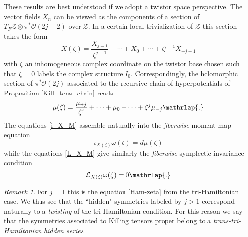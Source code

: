 \documentclass[11pt]{amsart}
\theoremstyle{remark}
\newtheorem*{remark}{Remark}
\theoremstyle{remark}
\theoremstyle{definition}
\theoremstyle{definition}
\theoremstyle{definition}
\newcommand{\0}{{\scriptstyle 0'}} %
\newcommand{\1}{{\scriptstyle 1'}}
\begin{document}
These results are best understood if we adopt a twistor space perspective. The vector fields $X_n$ can be viewed as the components of a section of $T_F\mathcal{Z} \otimes \pi^*\mathcal{O}(2j-2)$ over $\mathcal{Z}$. In a certain local trivialization of $\mathcal{Z}$ this section takes the form
\begin{equation} \label{twisted_X}
X(\zeta) = \frac{X_{j-1}}{\zeta^{j-1}} + \cdots + X_0 + \cdots + \zeta^{j-1} X_{-j+1}
\end{equation}
with $\zeta$ an inhomogeneous complex coordinate on the twistor base chosen such that $\zeta = 0$ labels the complex structure $I_0$. Correspondingly, the holomorphic section of $\pi^*\mathcal{O}(2j)$ associated to the recursive chain of hyperpotentials of Proposition \ref{Kill_tens_chain} reads
\begin{equation}
\mu(\zeta) = \frac{\mu_{+j}}{\zeta^j} + \cdots + \mu_0 + \cdots + \zeta^j \mu_{-j} \mathrlap{.}
\end{equation}
The equations \eqref{i_X_M} assemble naturally into the \textit{fiberwise} moment map equation 
\begin{equation} \label{twist_mom-map}
\iota_{X(\zeta)} \omega(\zeta) = d\mu(\zeta) 
\end{equation}
\noindent while the equations \eqref{L_X_M} give similarly the \textit{fiberwise} symplectic invariance condition 
\begin{equation} \label{twist_tri-Ham}
\mathcal{L}_{X(\zeta)} \omega(\zeta) = 0 \mathrlap{.}
\end{equation}

\begin{remark}
For $j=1$ this is the equation \eqref{Ham-zeta} from the tri-Hamiltonian case. We thus see that the ``hidden" symmetries labeled by $j>1$ correspond naturally to a \textit{twisting} of the tri-Ha\-mil\-to\-nian condition. For this reason we say that the symmetries associated to Killing tensors proper belong to a \textit{trans-tri-Ha\-mil\-to\-nian hidden series}.
\end{remark}
\end{document}
